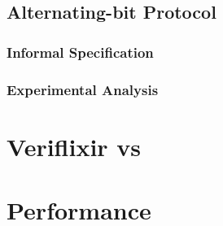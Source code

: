 \subsection{Alternating-bit Protocol} \label{sec:ab}
\subsubsection{Informal Specification}
\subsubsection{Experimental Analysis}
\section{Veriflixir vs } \label{sec:vs}
\section{Performance} \label{sec:perf}